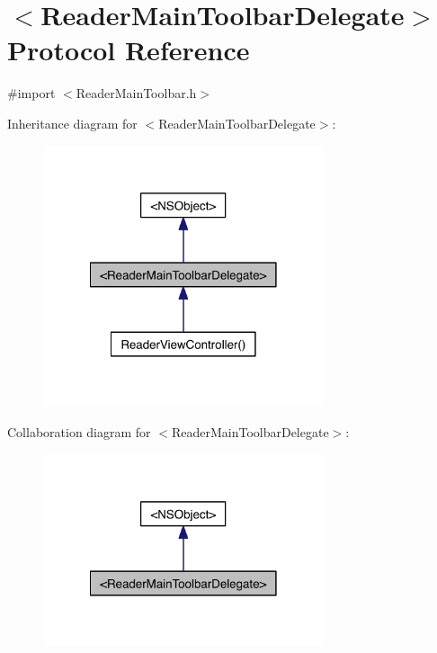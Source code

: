 \hypertarget{protocol_reader_main_toolbar_delegate-p}{\section{$<$Reader\-Main\-Toolbar\-Delegate$>$ Protocol Reference}
\label{dd/db6/protocol_reader_main_toolbar_delegate-p}
}


{\ttfamily \#import $<$Reader\-Main\-Toolbar.\-h$>$}



Inheritance diagram for $<$Reader\-Main\-Toolbar\-Delegate$>$\-:
\nopagebreak
\begin{figure}[H]
\begin{center}
\leavevmode
\includegraphics[width=234pt]{de/dd2/protocol_reader_main_toolbar_delegate-p__inherit__graph}
\end{center}
\end{figure}


Collaboration diagram for $<$Reader\-Main\-Toolbar\-Delegate$>$\-:
\nopagebreak
\begin{figure}[H]
\begin{center}
\leavevmode
\includegraphics[width=234pt]{da/d62/protocol_reader_main_toolbar_delegate-p__coll__graph}
\end{center}
\end{figure}
